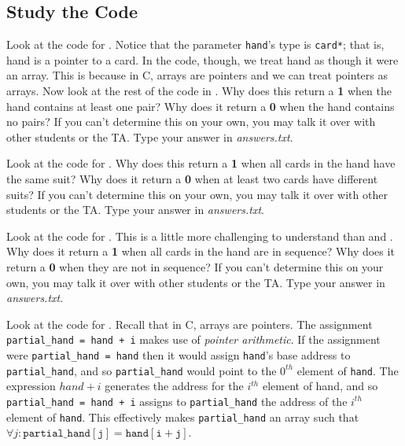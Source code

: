 \subsection{Study the Code}
\label{StudyTheCode}

Look at the code for . Notice that the parameter
\lstinline{hand}'s type is \lstinline{card*}; that is, \lstinline{}{hand} is a
pointer to a \lstinline{}{card}. In the code, though, we treat
\lstinline{}{hand} as though it were an array. This is because in C, arrays are
pointers and we can treat pointers as arrays. Now look at the rest of the code
in . Why does this return a \textbf{1} when the hand
contains at least one pair?  Why does it return a \textbf{0} when the hand
contains no pairs?  If you can't determine this on your own, you may talk it
over with other students or the TA. Type your answer in \textit{answers.txt}.

Look at the code for . Why does this return a \textbf{1}
when all cards in the hand have the same suit?  Why does it return a \textbf{0}
when at least two cards have different suits?  If you can't determine this on
your own, you may talk it over with other students or the TA. Type your answer
in \textit{answers.txt}.

Look at the code for . This is a little more challenging
to understand than  and . Why does it
return a \textbf{1} when all cards in the hand are in sequence?  Why does it
return a \textbf{0} when they are not in sequence? If you can't determine this
on your own, you may talk it over with other students or the TA. Type your
answer in \textit{answers.txt}.

Look at the code for . Recall that in C, arrays are
pointers. The assignment \lstinline{partial_hand = hand + i} makes use of
\textit{pointer arithmetic}. If the assignment were
\lstinline{partial_hand = hand} then it would assign \lstinline{hand}'s base
address to \lstinline{partial_hand}, and so \lstinline{partial_hand} would point
to the $0^{th}$ element of \lstinline{hand}. The expression $hand+i$ generates
the address for the $i^{th}$ element of \lstinline{}{hand}, and so
\lstinline{partial_hand = hand + i} assigns to \lstinline{partial_hand} the
address of the $i^{th}$ element of \lstinline{hand}. This effectively makes
\lstinline{partial_hand} an array such that
$\forall j : \mathtt{partial\_hand[j] = hand[i+j]}$.

